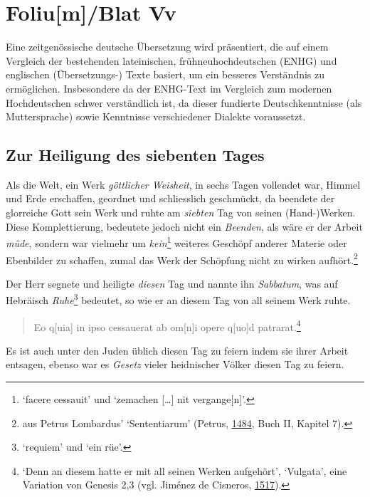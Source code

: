 \documentclass[
]{article}
\author{Dietmar Gerald Schrausser}
\date{09.05.2026}
\begin{document}
\hypertarget{foliumblat-vv}{%
\section{Foliu{[}m{]}/Blat Vv}\label{foliumblat-vv}}

Eine zeitgenössische deutsche Übersetzung wird präsentiert, die auf
einem Vergleich der bestehenden lateinischen, frühneuhochdeutschen
(ENHG) und englischen (Übersetzungs-) Texte basiert, um ein besseres
Verständnis zu ermöglichen. Insbesondere da der ENHG-Text im Vergleich
zum modernen Hochdeutschen schwer verständlich ist, da dieser fundierte
Deutschkenntnisse (als Muttersprache) sowie Kenntnisse verschiedener
Dialekte voraussetzt.

\hypertarget{zur-heiligung-des-siebenten-tages}{%
\subsection{Zur Heiligung des siebenten
Tages}\label{zur-heiligung-des-siebenten-tages}}

Als die Welt, ein Werk \emph{göttlicher Weisheit}, in sechs Tagen
vollendet war, Himmel und Erde erschaffen, geordnet und schliesslich
geschmückt, da beendete der glorreiche Gott sein Werk und ruhte am
\emph{siebten} Tag von seinen (Hand-)Werken. Diese Komplettierung,
bedeutete jedoch nicht ein \emph{Beenden}, als wäre er der Arbeit
\emph{müde}, sondern war vielmehr um \emph{kein}\footnote{`facere
  cessauit' und `zemachen {[}\ldots{]} nit vergange{[}n{]}'.} weiteres
Geschöpf anderer Materie oder Ebenbilder zu schaffen, zumal das Werk der
Schöpfung nicht zu wirken aufhört.\footnote{aus Petrus Lombardus'
  `Sententiarum' (Petrus,
  \href{https://doi.org/10.3931/e-rara-18241}{1484}, Buch II, Kapitel
  7).}

Der Herr segnete und heiligte \emph{diesen} Tag und nannte ihn
\emph{Sabbatum}, was auf Hebräisch \emph{Ruhe}\footnote{`requiem' und
  `ein rüe'.} bedeutet, so wie er an diesem Tag von all seinem Werk
ruhte.

\begin{quote}
Eo q{[}uia{]} in ipso cessauerat ab om{[}n{]}i opere q{[}uo{]}d
patrarat.\footnote{`Denn an diesem hatte er mit all seinen Werken
  aufgehört', `Vulgata', eine Variation von Genesis 2,3 (vgl. Jiménez de
  Cisneros, \href{https://doi.org/10.3931/e-rara-46695}{1517}).}
\end{quote}

Es ist auch unter den Juden üblich diesen Tag zu feiern indem sie ihrer
Arbeit entsagen, ebenso war es \emph{Gesetz} vieler heidnischer Völker
diesen Tag zu feiern.
\end{document}
